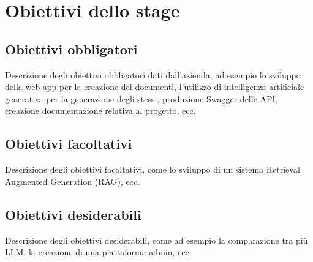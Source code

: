 \section{Obiettivi dello stage}
\label{sez:obiettivi-stage}

\subsection{Obiettivi obbligatori}
\label{subsec:obiettivi-obbligatori}

Descrizione degli obiettivi obbligatori dati dall'azienda, ad esempio lo sviluppo della web app per la creazione dei documenti, l'utilizzo di intelligenza artificiale generativa per la generazione degli stessi, 
produzione Swagger delle API, creazione documentazione relativa al progetto, ecc.

\subsection{Obiettivi facoltativi}
\label{subsec:obiettivi-facoltativi}

Descrizione degli obiettivi facoltativi, come lo sviluppo di un sistema Retrieval Augmented Generation (RAG), ecc.

\subsection{Obiettivi desiderabili}

Descrizione degli obiettivi desiderabili, come ad esempio la comparazione tra più LLM, la creazione di una piattaforma admin, ecc.